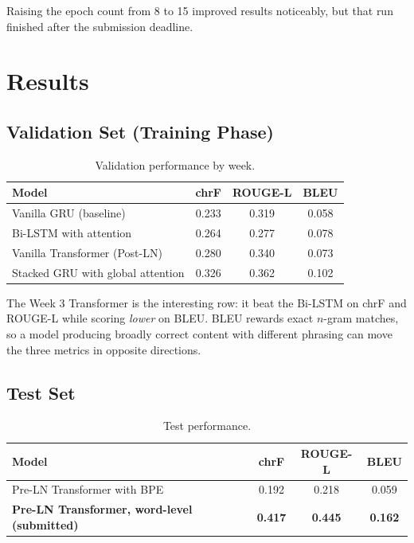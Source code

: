 \documentclass[11pt, oneside]{article}
\begin{document}
Raising the epoch count from 8 to 15 improved results noticeably, but that run finished after
the submission deadline.

\section{Results}

\subsection{Validation Set (Training Phase)}

\begin{table}[h!]
\centering
\small
\begin{tabular}{@{}lccc@{}}
\toprule
Model & chrF & ROUGE-L & BLEU \\
\midrule
Vanilla GRU (baseline) & 0.233 & 0.319 & 0.058 \\
Bi-LSTM with attention & 0.264 & 0.277 & 0.078 \\
Vanilla Transformer (Post-LN) & 0.280 & 0.340 & 0.073 \\
Stacked GRU with global attention & 0.326 & 0.362 & 0.102 \\
\bottomrule
\end{tabular}
\caption{Validation performance by week.}
\end{table}

The Week 3 Transformer is the interesting row: it beat the Bi-LSTM on chrF and ROUGE-L while
scoring \emph{lower} on BLEU. BLEU rewards exact $n$-gram matches, so a model producing
broadly correct content with different phrasing can move the three metrics in opposite
directions.

\subsection{Test Set}

\begin{table}[h!]
\centering
\small
\begin{tabular}{@{}lccc@{}}
\toprule
Model & chrF & ROUGE-L & BLEU \\
\midrule
Pre-LN Transformer with BPE & 0.192 & 0.218 & 0.059 \\
\textbf{Pre-LN Transformer, word-level (submitted)} & \textbf{0.417} & \textbf{0.445} & \textbf{0.162} \\
\bottomrule
\end{tabular}
\caption{Test performance.}
\end{table}
\end{document}
